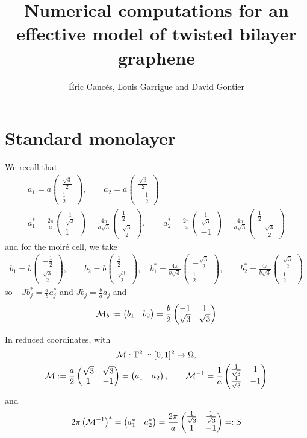 \documentclass[11pt,a4paper,reqno,french,tikz]{amsart}
\title[Numerics effective TBG]{Numerical computations for an effective model of twisted bilayer graphene}
\author[É. Cancès, L. Garrigue and D. Gontier]{Éric Cancès, Louis Garrigue and David Gontier}
\newcommand{\pa}[1]{\left( #1 \right)} %
\newcommand{\f}[2]{\frac{#1}{#2}} %
\newcommand{\mat}[1]{\begin{pmatrix} #1 \end{pmatrix}} %
\begin{document}
\maketitle

\section{Standard monolayer}%
\label{sec:standard_monolayer}

We recall that 
\begin{multline*}
a_1 = a \mat{ \f{\sqrt 3}2 \\ \f 12}, \qquad a_2 = a \mat{ \f{\sqrt 3}2 \\ -\f 12} \\
a^*_1 = \f{2\pi}{a} \mat{ \f{1}{\sqrt 3} \\ 1}= \f{4\pi}{a\sqrt{3}} \mat{ \f{1}{2} \\ \f{\sqrt{3}}{2}}, \qquad a^*_2 = \f{2\pi}{a} \mat{ \f{1}{\sqrt 3} \\ -1}= \f{4\pi}{a\sqrt{3}} \mat{ \f{1}{2} \\ -\f{\sqrt{3}}{2}}
\end{multline*}
and for the moiré cell, we take
\begin{multline*}
b_1 = b \mat{ -\f 12 \\ \f{\sqrt 3}{2}  }, \qquad b_2 = b \mat{ \f 12 \\ \f{\sqrt 3}2}, \quad b^*_1 = \f{4\pi}{b\sqrt{3}} \mat{- \f{\sqrt{3}}{2}\\ \f{1}{2} }, \qquad b^*_2 = \f{4\pi}{b\sqrt{3}} \mat{\f{\sqrt{3}}{2} \\ \f{1}{2} }
\end{multline*}
so $-J b_j^* = \f{a}{b} a_j^*$ and $J b_j = \f{b}{a} a_j$ and 
\begin{align*}
	\cM_b := \mat{b_1 & b_2} = \f{b}{2} \mat{-1 & 1 \\ \sqrt 3 & \sqrt 3}
\end{align*}

In reduced coordinates, with 
\begin{multline*}
	\cM : \mathbb{T}^2 \simeq [0,1]^2 \rightarrow \Omega, \\
	\cM :=  \f a2 \mat{\sqrt{3} & \sqrt{3} \\ 1 & -1} = \mat{a_1 & a_2}, \qquad  \cM^{-1} = \f 1a \mat{\f 1{\sqrt 3} & 1 \\ \f 1{\sqrt 3} & -1}
\end{multline*}
and
\begin{align*}
	2\pi \pa{\cM^{-1}}^* = \mat{a_1^* & a_2^*} = \f{2\pi}a \mat{\f{1}{\sqrt 3} & \f{1}{\sqrt 3} \\ 1 & -1} =: S
\end{align*}
\end{document}
